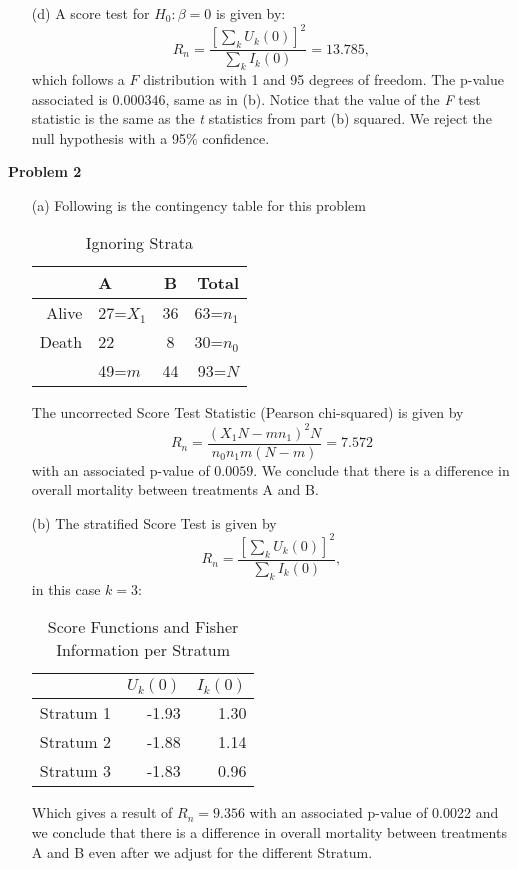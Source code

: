 \documentclass[11pt,a4paper]{article}
\begin{document}
\begin{itemize}
\item[(d)] A score test for $H_0: \beta = 0$ is given by:
$$R_n=\dfrac{[\sum_k U_k(0)]^2}{\sum_k I_k(0)}=13.785,$$ which follows a $F$ distribution
 with 1 and 95 degrees of freedom. The p-value associated is $0.000346$, same as in (b). Notice that the value of the \emph{F} test statistic is the same as the \emph{t} statistics from part (b) squared. We reject the null hypothesis with a 95\% confidence.
\end{itemize}

\noindent
\textbf{Problem 2} 
\begin{itemize}
\item[(a)] Following is the contingency table for this problem
\begin{table}[ht]
\centering
\begin{tabular}{rlcr}
  \hline
 & A & B & Total\\ 
  \hline
Alive &  27=$X_1$ &  36 & 63=$n_1$ \\ 
  Death &  22 &   8& 30=$n_0$ \\ 
\hline
 &  49=$m$ &   44& 93=$N$\\
   \hline
\end{tabular}
\caption{Ignoring Strata}
\end{table}
\newpage
The uncorrected Score Test Statistic (Pearson chi-squared) is given by 
$$R_n=\dfrac{(X_1 N-mn_1)^2N}{n_0n_1m(N-m)} = 7.572$$ 
with an associated p-value of $0.0059$. We conclude that there is a difference in overall mortality between treatments A and B. 

\item[(b)] The stratified Score Test is given by $$R_n=\dfrac{[\sum_k U_k(0)]^2}{\sum_k I_k(0)},$$
in this case $k=3$:

\begin{table}[ht]
\centering
\begin{tabular}{rrr}
  \hline
 & $U_k(0)$ & $I_k(0)$ \\ 
  \hline
Stratum 1 & -1.93 & 1.30 \\ 
Stratum 2 & -1.88 & 1.14 \\ 
Stratum 3 & -1.83 & 0.96 \\ 
   \hline
\end{tabular}
\caption{Score Functions and Fisher Information per Stratum}
\end{table}

Which gives a result of $R_n=9.356$ with an associated p-value of 
0.0022 and we conclude that there is a difference in overall mortality between treatments A and B even after
we adjust for the different Stratum.
\end{itemize}
\end{document}
